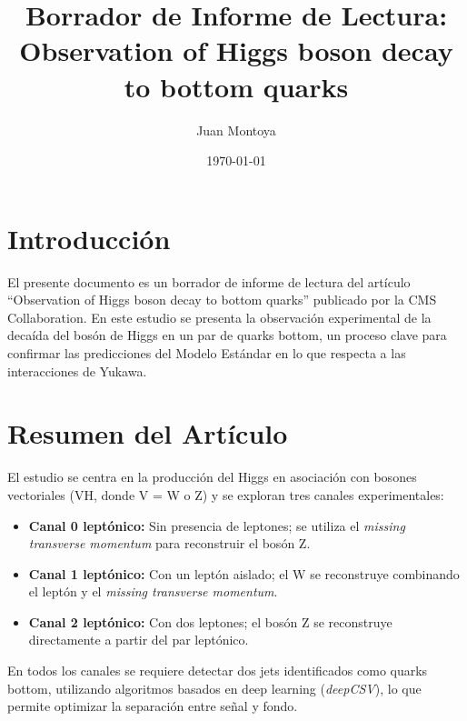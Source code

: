 \documentclass[a4paper,12pt]{article}
\title{Borrador de Informe de Lectura:\\
Observation of Higgs boson decay to bottom quarks}
\author{Juan Montoya}
\date{\today}
\begin{document}
\maketitle

\section{Introducción}
El presente documento es un borrador de informe de lectura del artículo ``Observation of Higgs boson decay to bottom quarks'' publicado por la CMS Collaboration. En este estudio se presenta la observación experimental de la decaída del bosón de Higgs en un par de quarks bottom, un proceso clave para confirmar las predicciones del Modelo Estándar en lo que respecta a las interacciones de Yukawa.

\section{Resumen del Artículo}
El estudio se centra en la producción del Higgs en asociación con bosones vectoriales (VH, donde V = W o Z) y se exploran tres canales experimentales:
\begin{itemize}
    \item \textbf{Canal 0 leptónico:} Sin presencia de leptones; se utiliza el \textit{missing transverse momentum} para reconstruir el bosón Z.
    \item \textbf{Canal 1 leptónico:} Con un leptón aislado; el W se reconstruye combinando el leptón y el \textit{missing transverse momentum}.
    \item \textbf{Canal 2 leptónico:} Con dos leptones; el bosón Z se reconstruye directamente a partir del par leptónico.
\end{itemize}
En todos los canales se requiere detectar dos jets identificados como quarks bottom, utilizando algoritmos basados en deep learning (\textit{deepCSV}), lo que permite optimizar la separación entre señal y fondo.
\end{document}
